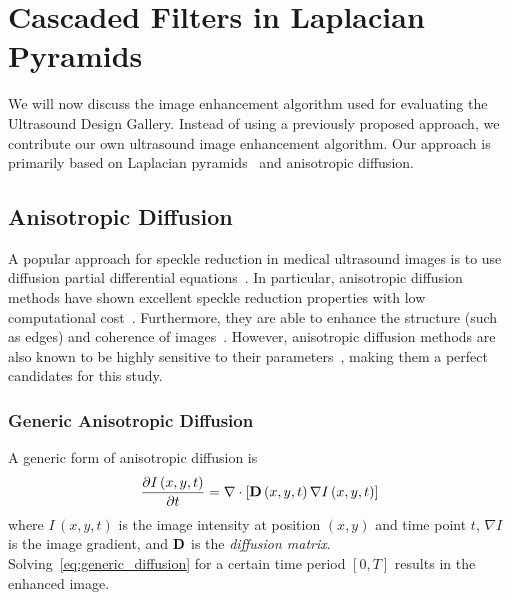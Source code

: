 \section{Cascaded Filters in Laplacian Pyramids}\label{section:filter}

We will now discuss the image enhancement algorithm used for evaluating the Ultrasound Design Gallery.
Instead of using a previously proposed approach, we contribute our own ultrasound image enhancement algorithm.
Our approach is primarily based on Laplacian pyramids~\cite{zhang_multiscale_2006, zhang_nonlinear_2007, kang_new_2016} and anisotropic diffusion.

\subsection{Anisotropic Diffusion}
A popular approach for speckle reduction in medical ultrasound images is to use diffusion partial differential equations~\cite{perona_scalespace_1990, weickert_anisotropic_1998}.
In particular, anisotropic diffusion methods have shown excellent speckle reduction properties with low computational cost~\cite{finn_echocardiographic_2011}.
Furthermore, they are able to enhance the structure (such as edges) and coherence of images~\cite{abd-elmoniem_realtime_2002, kang_new_2016}.
However, anisotropic diffusion methods are also known to be highly sensitive to their parameters~\cite{duarte-salazar_speckle_2020}, making them a perfect candidates for this study.


\subsubsection{Generic Anisotropic Diffusion}
A generic form of anisotropic diffusion is
\begin{align}
  \frac{\partial I\,(x, y, t)}{\partial t} = \nabla \cdot [ \mathbf{D}\,(x, y, t) \, \nabla I\,(x, y, t) ] \label{eq:generic_diffusion}
\end{align}
where \(I\,(x, y, t)\) is the image intensity at position \((x, y)\) and time point \(t\), \(\nabla I\) is the image gradient, and \(\mathbf{D}\) is the \textit{diffusion matrix}.
Solving~\eqref{eq:generic_diffusion} for a certain time period \([0, T]\) results in the enhanced image.

